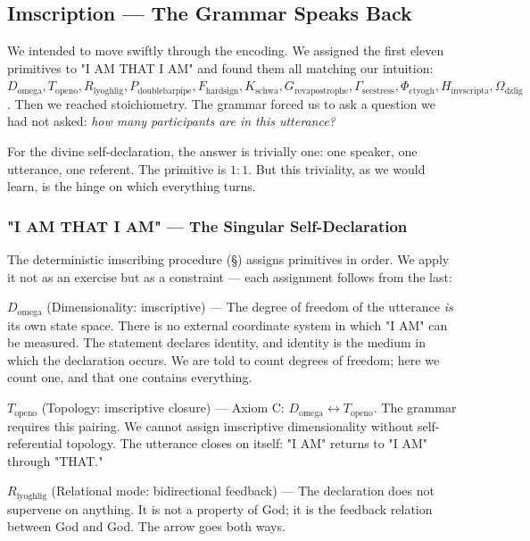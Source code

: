 \documentclass[12pt,a4paper]{article}
\newcommand{\pilcrow}{\S}
\begin{document}
\subsection{Imscription --- The Grammar Speaks Back}

We intended to move swiftly through the encoding. We assigned the first eleven primitives to "I AM THAT I AM" and found them all matching our intuition: $D_{\text{omega}}, T_{\text{openo}}, R_{\text{lyoghlig}}, P_{\text{doublebarpipe}}, F_{\text{hardsign}}, K_{\text{schwa}}, G_{\text{revapostrophe}}, \Gamma_{\text{secstress}}, \Phi_{\text{ctyogh}}, H_{\text{invscripta}}, \Omega_{\text{dzlig}}$. Then we reached stoichiometry. The grammar forced us to ask a question we had not asked: \emph{how many participants are in this utterance?}

For the divine self-declaration, the answer is trivially one: one speaker, one utterance, one referent. The primitive is $1{:}1$. But this triviality, as we would learn, is the hinge on which everything turns.

\subsubsection{"I AM THAT I AM" --- The Singular Self-Declaration}

The deterministic imscribing procedure (\pilcrow{}) assigns primitives in order. We apply it not as an exercise but as a constraint --- each assignment follows from the last:

\textbf{$D_{\text{omega}}$} (Dimensionality: imscriptive) --- The degree of freedom of the utterance \emph{is} its own state space. There is no external coordinate system in which "I AM" can be measured. The statement declares identity, and identity is the medium in which the declaration occurs. We are told to count degrees of freedom; here we count one, and that one contains everything.

\textbf{$T_{\text{openo}}$} (Topology: imscriptive closure) --- Axiom C: $D_{\text{omega}} \leftrightarrow T_{\text{openo}}$. The grammar requires this pairing. We cannot assign imscriptive dimensionality without self-referential topology. The utterance closes on itself: "I AM" returns to "I AM" through "THAT."

\textbf{$R_{\text{lyoghlig}}$} (Relational mode: bidirectional feedback) --- The declaration does not supervene on anything. It is not a property of God; it is the feedback relation between God and God. The arrow goes both ways.
\end{document}
